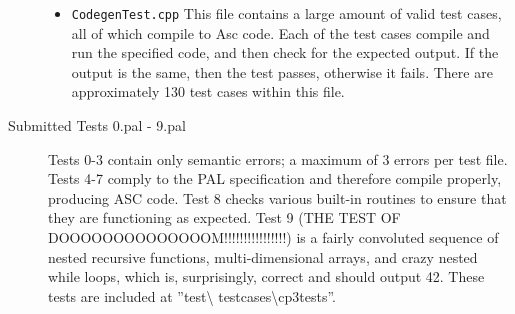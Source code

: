 \documentclass{article}
\begin{document}
\begin{description}
\begin{itemize}
		\item \texttt{CodegenTest.cpp} This file contains a large amount of valid test cases,
		all of which compile to Asc code. Each of the test cases compile and run the specified code, 
		and then check for the expected output. If the output is the same, then the test passes,
		otherwise it fails. There are approximately 130 test cases within this file.
	\end{itemize}
\item[Submitted Tests 0.pal - 9.pal]
	Tests 0-3 contain only semantic errors; a maximum of 3 errors per test file. Tests 4-7 comply to
	the PAL specification and therefore compile properly, producing ASC code. Test 8 checks various built-in
	routines to ensure that they are functioning as expected. Test 9 (THE TEST OF DOOOOOOOOOOOOOOM!!!!!!!!!!!!!!!!)
	is a fairly convoluted sequence of nested recursive functions, multi-dimensional arrays, and crazy nested while loops,
	which is, surprisingly, correct and should output 42. 
	These tests are included at ''test\textbackslash 
	test\textunderscore cases\textbackslash cp3tests''.
\end{description}
\end{document}
